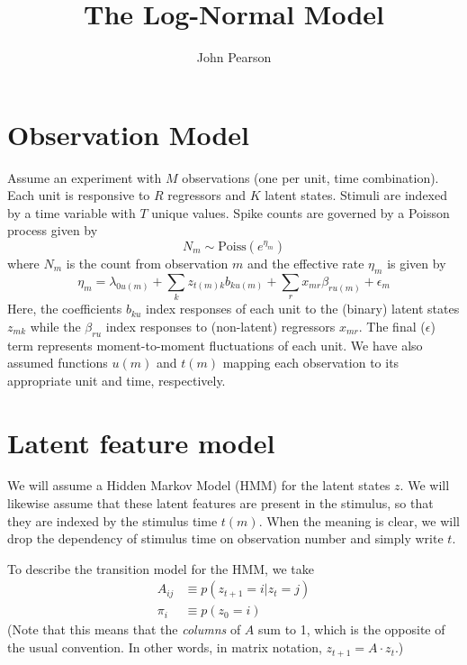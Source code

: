 \documentclass[11pt]{article}
\begin{document}
\title{The Log-Normal Model}
\author{John Pearson}
\maketitle

\section{Observation Model}
Assume an experiment with $M$ observations (one per unit, time combination). Each unit is responsive to $R$ regressors and $K$ latent states. Stimuli are indexed by a time variable with $T$ unique values. Spike counts are governed by a Poisson process given by
\begin{equation}
    N_{m} \sim \mathrm{Poiss}(e^{\eta_{m}})
\end{equation}
where $N_{m}$ is the count from observation $m$ and the effective rate $\eta_{m}$ is given by
\begin{equation}
    \label{loglambda}
    \eta_m = \lambda_{0u(m)} + \sum_k z_{t(m)k} b_{ku(m)} + \sum_r x_{mr} \beta_{ru(m)} + \epsilon_{m}
\end{equation}
Here, the coefficients $b_{ku}$ index responses of each unit to the (binary) latent states $z_{mk}$ while the $\beta_{ru}$ index responses to (non-latent) regressors $x_{mr}$. The final ($\epsilon$) term represents moment-to-moment fluctuations of each unit. We have also assumed functions $u(m)$ and $t(m)$ mapping each observation to its appropriate unit and time, respectively.

\section{Latent feature model}
We will assume a Hidden Markov Model (HMM) for the latent states $z$. We will likewise assume that these latent features are present in the stimulus, so that they are indexed by the stimulus time $t(m)$. When the meaning is clear, we will drop the dependency of stimulus time on observation number and simply write $t$.

To describe the transition model for the HMM, we take
\begin{align}
    A_{ij} &\equiv p(z_{t+1} = i|z_t = j) \\
    \pi_i &\equiv p(z_0 = i)
\end{align}
(Note that this means that the \emph{columns} of $A$ sum to 1, which is the opposite of the usual convention. In other words, in matrix notation, $z_{t+1} = A \cdot z_t$.)
\end{document}
